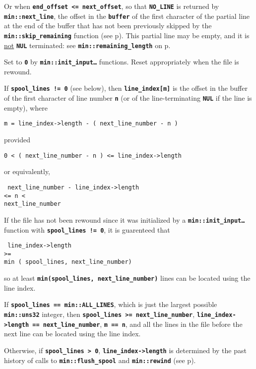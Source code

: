 \documentclass[12pt]{article}
\makeatletter
\newcommand{\TT}[1]{{\tt \bfseries #1}}
\newcommand{\ttmkey}[2]{\TT{#1}\index{#1@{\tt #1}!#2}}
\newcommand{\pagref}[1]{p\pageref{#1}}
\newcommand{\EOL}{\penalty \exhyphenpenalty}
\newenvironment{itemlist}[1][1.2in]%
	{\begin{list}{}{\setlength{\labelwidth}{#1}%
		        \setlength{\leftmargin}{\labelwidth}%
		        \addtolength{\leftmargin}{+0.2in}%
		        \renewcommand{\makelabel}[1]{##1\hfill}}}%
	{\end{list}}
\makeatother
\begin{document}
\begin{itemlist}[1.4in]
Or when \TT{end\_offset <= next\_offset}, so that
\TT{NO\_\EOL LINE} is returned by \TT{min::\EOL next\_\EOL line},
the offset in the \TT{buffer} of the first character of the
partial line at the end of the buffer
that has not been previously skipped by
the \TT{min::\EOL skip\_\EOL remaining} function
(see \pagref{MIN::SKIP_REMAINING}).  This partial line may be
empty, and it is \underline{not} \TT{NUL} terminated:
see \TT{min::\EOL remaining\_\EOL length} on
\pagref{MIN::REMAINING_LENGTH}.

Set to \TT{0} by \TT{min::\EOL init\_\EOL input\ldots} functions.
Reset appropriately when the file is rewound.

\item[\ttmkey{line\_\EOL index}{in {\tt min::file}}]
If \TT{spool\_lines~!=~0} (see below), then
\TT{line\_index[m]} is the offset in the buffer of the first
character of line number \TT{n} (or of the line-terminating \TT{NUL}
if the line is empty), where
\begin{center}
{\tt m = line\_index->length - ( next\_line\_number - n )}
\end{center}
provided
\begin{center}
{\tt 0 < ( next\_line\_number - n ) <= line\_index->length}
\end{center}
or equivalently,
\begin{center}
\tt
next\_line\_number - line\_index->length \\
<= n < \\
next\_line\_number
\end{center}

If the file has not been rewound since it was initialized by
a \TT{min::\EOL init\_\EOL input\ldots} function with
\TT{spool\_lines~!=~0}, it is guarenteed that
\begin{center}
\tt
line\_index->length \\
>= \\
min ( spool\_lines, next\_line\_number)
\end{center}
so at least \TT{min(spool\_lines, next\_line\_number)}
lines can be located using the line index.

If \TT{spool\_lines~==~min::ALL\_LINES}, which is just the largest possible
\TT{min::uns32} integer, then \TT{spool\_lines >= next\_line\_number},
\TT{line\_\EOL index->\EOL length == next\_\EOL line\_\EOL number},
\TT{m~==~n}, and all the lines in the file before the next line can be located
using the line index.

Otherwise, if \TT{spool\_lines~>~0},
\TT{line\_\EOL index->\EOL length} is determined by
the past history of calls to \TT{min::\EOL flush\_\EOL spool} and
\TT{min::rewind} (see \pagref{LINE-INDEX-LENGTH}).


\end{itemlist}
\end{document}
